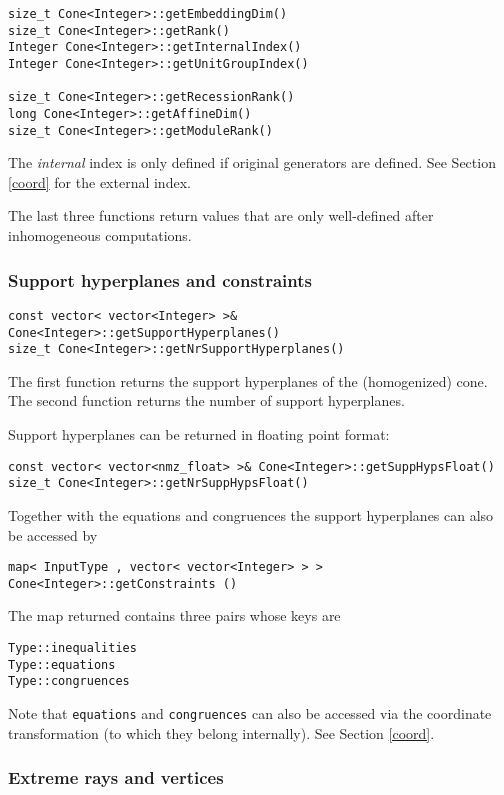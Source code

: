 \documentclass[12pt,a4paper]{scrartcl}
\theoremstyle{definition}
\begin{document}
\begin{small}
\begin{Verbatim}
size_t Cone<Integer>::getEmbeddingDim()
size_t Cone<Integer>::getRank()
Integer Cone<Integer>::getInternalIndex()
Integer Cone<Integer>::getUnitGroupIndex()

size_t Cone<Integer>::getRecessionRank()
long Cone<Integer>::getAffineDim()
size_t Cone<Integer>::getModuleRank()
\end{Verbatim}

The \emph{internal} index is only defined if original generators are defined. See Section \ref{coord} for the external index.

The last three functions return values that are only well-defined after inhomogeneous computations.

\subsubsection{Support hyperplanes and constraints}\label{SHC}

\begin{Verbatim}
const vector< vector<Integer> >& Cone<Integer>::getSupportHyperplanes()
size_t Cone<Integer>::getNrSupportHyperplanes()
\end{Verbatim}

The first function returns the support hyperplanes of the (homogenized) cone.
The second function returns the number of support hyperplanes.

Support hyperplanes can be returned in floating point format:
\begin{Verbatim}
const vector< vector<nmz_float> >& Cone<Integer>::getSuppHypsFloat()
size_t Cone<Integer>::getNrSuppHypsFloat()
\end{Verbatim}

Together with the equations and congruences the support hyperplanes can also be accessed by
\begin{Verbatim}
map< InputType , vector< vector<Integer> > > Cone<Integer>::getConstraints ()
\end{Verbatim}
The map returned contains three pairs whose keys are
\begin{Verbatim}
Type::inequalities
Type::equations
Type::congruences
\end{Verbatim}

Note that \verb|equations|  and \verb|congruences| can also be accessed via the coordinate transformation (to which they belong internally). See Section \ref{coord}.

\subsubsection{Extreme rays and vertices}


\end{small}
\end{document}
